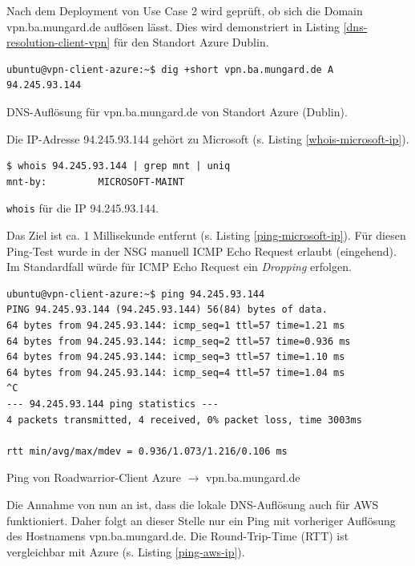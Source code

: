Nach dem \gls{Deployment} von Use Case 2 wird geprüft, ob sich die Domain vpn.ba.mungard.de auflösen lässt. Dies wird demonstriert in Listing \ref{dns-resolution-client-vpn} für den Standort Azure Dublin.
\begin{listing}[h]
\begin{verbatim}
ubuntu@vpn-client-azure:~$ dig +short vpn.ba.mungard.de A
94.245.93.144

\end{verbatim}
\caption{DNS-Auflösung für vpn.ba.mungard.de von Standort Azure (Dublin).}
\label{dns-resolution-client-vpn}
\end{listing}\FloatBarrier
Die IP-Adresse 94.245.93.144 gehört zu Microsoft (s. Listing \ref{whois-microsoft-ip}).
\begin{listing}[h]
\begin{verbatim}
$ whois 94.245.93.144 | grep mnt | uniq
mnt-by:         MICROSOFT-MAINT

\end{verbatim}
\caption{\texttt{whois} für die IP 94.245.93.144.}
\label{whois-microsoft-ip}
\end{listing}\FloatBarrier
Das Ziel ist ca. 1 Millisekunde entfernt (s. Listing \ref{ping-microsoft-ip}). Für diesen Ping-Test wurde in der \gls{NSG} manuell \gls{ICMP} Echo Request erlaubt (eingehend). Im Standardfall würde für \gls{ICMP} Echo Request ein \textit{Dropping} erfolgen.
\begin{listing}[h]
\begin{verbatim}
ubuntu@vpn-client-azure:~$ ping 94.245.93.144
PING 94.245.93.144 (94.245.93.144) 56(84) bytes of data.
64 bytes from 94.245.93.144: icmp_seq=1 ttl=57 time=1.21 ms
64 bytes from 94.245.93.144: icmp_seq=2 ttl=57 time=0.936 ms
64 bytes from 94.245.93.144: icmp_seq=3 ttl=57 time=1.10 ms
64 bytes from 94.245.93.144: icmp_seq=4 ttl=57 time=1.04 ms
^C
--- 94.245.93.144 ping statistics ---
4 packets transmitted, 4 received, 0% packet loss, time 3003ms

rtt min/avg/max/mdev = 0.936/1.073/1.216/0.106 ms

\end{verbatim}
\caption{Ping von Roadwarrior-Client Azure $\rightarrow$ vpn.ba.mungard.de}
\label{ping-microsoft-ip}
\end{listing}\FloatBarrier
Die Annahme von nun an ist, dass die lokale \gls{DNS}-Auflösung auch für AWS funktioniert. Daher folgt an dieser Stelle nur ein Ping mit vorheriger Auflösung des Hostnamens vpn.ba.mungard.de. Die Round-Trip-Time (RTT) ist vergleichbar mit Azure (s. Listing \ref{ping-aws-ip}).
